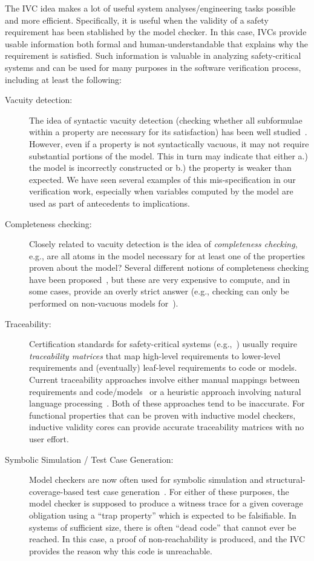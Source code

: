 The IVC idea makes a lot of useful system analyses/engineering tasks possible and more efficient. Specifically, it is useful when the validity of a safety requirement has been stablished by the model checker. In this case, IVCs provide usable information both formal and human-understandable that explains why the requirement is satisfied. Such information is valuable in analyzing safety-critical systems and can be used for many purposes in the software verification process, including at least the following:
\begin{description}
    \item[Vacuity detection:] The idea of syntactic vacuity detection (checking whether all subformulae within a property are necessary for its satisfaction) has been well studied~\cite{Kupferman03:Vacuity}.   However, even if a property is not syntactically vacuous, it may not require substantial portions of the model.  This in turn may indicate that either a.) the model is incorrectly constructed or b.) the property is weaker than expected.  We have seen several examples of this mis-specification in our verification work, especially when variables computed by the model are used as part of antecedents to implications.
    \item[Completeness checking:] Closely related to vacuity detection is the idea of {\em completeness checking}, e.g., are all atoms in the model necessary for at least one of the properties proven about the model?  Several different notions of completeness checking have been proposed~\cite{chockler_coverage_2003, kupferman_theory_2008}, but these are very expensive to compute, and in some cases, provide an overly strict answer (e.g., checking can only be performed on non-vacuous models for~\cite{kupferman_theory_2008}).  
    \item[Traceability:] Certification standards for safety-critical systems (e.g.,~\cite{DO178C, MOD:00-55}) usually require {\em traceability matrices} that map high-level requirements to lower-level requirements and (eventually) leaf-level requirements to code or models.  Current traceability approaches involve either manual mappings between requirements and code/models~\cite{SimulinkTraceability} or a heuristic approach involving natural language processing~\cite{Keenan12:Tracelab}.  Both of these approaches tend to be inaccurate.  For functional properties that can be proven with inductive model checkers, inductive validity cores can provide accurate traceability matrices with no user effort.
    \item[Symbolic Simulation / Test Case Generation:]  Model checkers are now often used for symbolic simulation and structural-coverage-based test case generation~\cite{SimulinkDesignVerifier,Whalen13:OMCDC}.  For either of these purposes, the model checker is supposed to produce a witness trace for a given coverage obligation using a ``trap property'' which is expected to be falsifiable.  In systems of sufficient size, there is often ``dead code'' that cannot ever be reached.  In this case, a proof of non-reachability is produced, and the IVC provides the reason why this code is unreachable.
\end{description}
